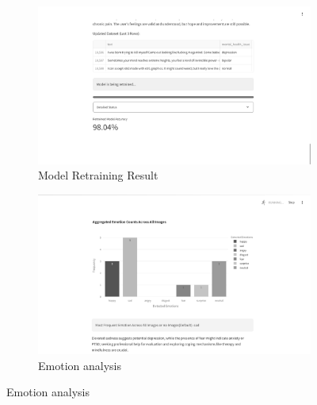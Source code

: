 \begin{figure}[h!]
    \centering
    \begin{subfigure}[b]{0.495\textwidth}
        \centering
        \includegraphics[width=\textwidth]{App Images/17 Interface.png}
        \caption*{Model Retraining Result}
        \label{fig:10i}
    \end{subfigure}
    \hfill
    \begin{subfigure}[b]{0.495\textwidth}
        \centering
        \includegraphics[width=\textwidth]{App Images/12-1 Interface.png}
        \caption*{Emotion analysis}
        \label{fig:10i23}
    \end{subfigure}
    \label{fig:comparison}
\end{figure}

\vspace{-2em}

